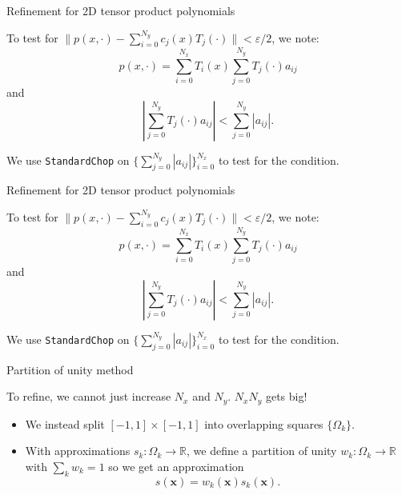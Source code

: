 \documentclass{beamer}
\newcommand{\R}{\mathbb{R}}
\newcommand{\vect}[1]{\mathbf{#1}}
\begin{document}
\begin{frame}{Refinement for 2D tensor product polynomials}
\begin{center}
To test for $\|p(x,\cdot) - \sum_{i=0}^{N_y} c_j(x)T_j(\cdot)\|<\varepsilon/2$, we note: $$p(x,\cdot)=\sum_{i=0}^{N_x} T_i(x) \sum_{j=0}^{N_y} T_j(\cdot)a_{ij}$$
and
$$ \left | \sum_{j=0}^{N_y} T_j(\cdot)a_{ij} \right | < \sum_{j=0}^{N_y} |a_{ij}|. $$
\end{center}

\begin{center}
We use {\tt StandardChop} on $\{ \sum_{j=0}^{N_y} |a_{ij}|  \}_{i=0}^{N_x}$ to test for the condition.
\end{center}
\end{frame}

\begin{frame}{Refinement for 2D tensor product polynomials}
\begin{center}
To test for $\|p(x,\cdot) - \sum_{i=0}^{N_y} c_j(x)T_j(\cdot)\|<\varepsilon/2$, we note: $$p(x,\cdot)=\sum_{i=0}^{N_x} T_i(x) \sum_{j=0}^{N_y} T_j(\cdot)a_{ij}$$
and
$$ \left | \sum_{j=0}^{N_y} T_j(\cdot)a_{ij} \right | < \sum_{j=0}^{N_y} |a_{ij}|. $$
\end{center}

\begin{center}
We use {\tt StandardChop} on $\{ \sum_{j=0}^{N_y} |a_{ij}|  \}_{i=0}^{N_x}$ to test for the condition.
\end{center}
\end{frame}

\begin{frame}{Partition of unity method}
\begin{center}
To refine, we cannot just increase $N_x$ and $N_y$. $N_x N_y$ gets big!
\end{center}

\begin{itemize}
\item We instead split $[-1,1] \times [-1,1]$ into overlapping squares $\{ \Omega_k \}$.
\item With approximations $s_k:\Omega_k \to \R$, we define a partition of unity $w_k:\Omega_k \to \R$ with $\sum_k w_k=1$ so we get an approximation $$s(\vect{x}) = w_k(\vect{x})s_k(\vect{x}).$$
\end{itemize}

\end{frame}
\end{document}
